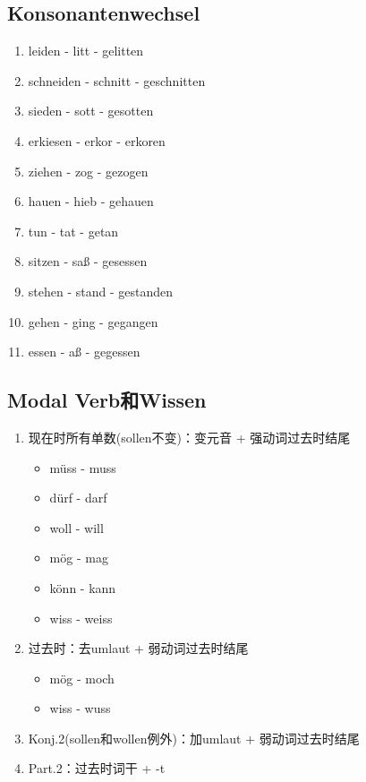\documentclass[UTF8]{report}
\begin{document}
\subsection{Konsonantenwechsel}
\begin{enumerate}
    \item leiden - litt - gelitten
    \item schneiden - schnitt - geschnitten
    \item sieden - sott - gesotten
    \item erkiesen - erkor - erkoren
    \item ziehen - zog - gezogen
    \item hauen - hieb - gehauen
    \item tun - tat - getan
    \item sitzen - saß - gesessen
    \item stehen - stand - gestanden
    \item gehen - ging - gegangen
    \item essen - aß - gegessen
\end{enumerate}

\subsection{Modal Verb和Wissen}
\begin{enumerate}
    \item 现在时所有单数(sollen不变)：变元音 + 强动词过去时结尾
    \begin{itemize}
        \item müss - muss
        \item dürf - darf
        \item woll - will
        \item mög - mag
        \item könn - kann
        \item wiss - weiss
    \end{itemize}
    \item 过去时：去umlaut + 弱动词过去时结尾
    \begin{itemize}
        \item mög - moch
        \item wiss - wuss
    \end{itemize}
    \item Konj.2(sollen和wollen例外)：加umlaut + 弱动词过去时结尾
    \item Part.2：过去时词干 + -t
\end{enumerate}
\end{document}
